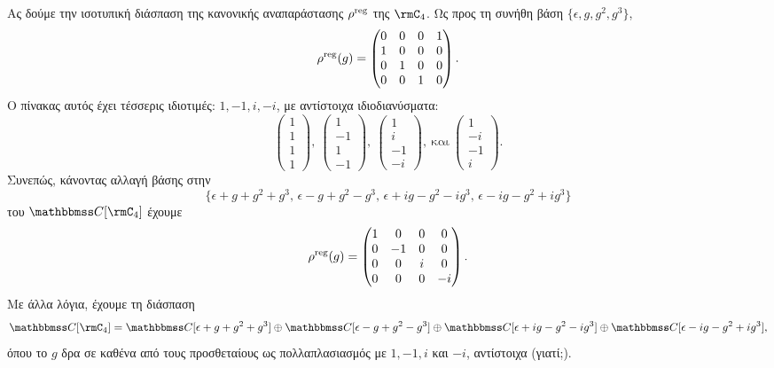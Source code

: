 \documentclass[12pt,a4paper,reqno]{amsart}
\begin{document}
Ας δούμε την ισοτυπική διάσπαση της κανονικής αναπαράστασης $\rho^{\mathrm{reg}}$ της $\rmC_4$. Ως προς τη συνήθη βάση $\{\epsilon, g, g^2, g^3\}$, 
\[
\rho^{\mathrm{reg}}(g) = 
\begin{pmatrix}
    0 & 0 & 0 & 1 \\
    1 & 0 & 0 & 0 \\
    0 & 1 & 0 & 0 \\
    0 & 0 & 1 & 0 \\
\end{pmatrix}.
\]
Ο πίνακας αυτός έχει τέσσερις ιδιοτιμές: $1, -1, i, -i$, με αντίστοιχα ιδιοδιανύσματα:
\[
\begin{pmatrix}
    1 \\ 
    1 \\ 
    1 \\
    1
\end{pmatrix}, \ 
\begin{pmatrix}
    1 \\ 
    -1 \\
    1 \\ 
    -1 
\end{pmatrix}, \ 
\begin{pmatrix}
    1 \\ 
    i \\ 
    -1 \\ 
    -i 
\end{pmatrix}, \ \text{και} \
\begin{pmatrix}
    1 \\ 
    -i \\
    -1 \\
    i
\end{pmatrix}.
\]
Συνεπώς, κάνοντας αλλαγή βάσης στην 
\[
\{
    \epsilon + g  + g^2 + g^3, \, 
    \epsilon - g  + g^2 - g^3, \, 
    \epsilon + ig - g^2 - ig^3, \, 
    \epsilon - ig - g^2 + ig^3
\}
\]
του $\CC[\rmC_4]$ έχουμε 
\[
\rho^{\mathrm{reg}}(g) = 
\begin{pmatrix}
    1 & 0 & 0 & 0 \\
    0 & -1 & 0 & 0 \\
    0 & 0 & i & 0 \\
    0 & 0 & 0 & -i 
\end{pmatrix}.
\]
Με άλλα λόγια, έχουμε τη διάσπαση 
\[
\CC[\rmC_4] = 
\CC[\epsilon + g  + g^2 + g^3] \oplus 
\CC[\epsilon - g  + g^2 - g^3] \oplus 
\CC[\epsilon + ig - g^2 - ig^3] \oplus 
\CC[\epsilon - ig - g^2 + ig^3],  
\]
όπου το $g$ δρα σε καθένα από τους προσθεταίους ως πολλαπλασιασμός με $1, -1, i$ και $-i$, αντίστοιχα (γιατί;).
\end{document}
